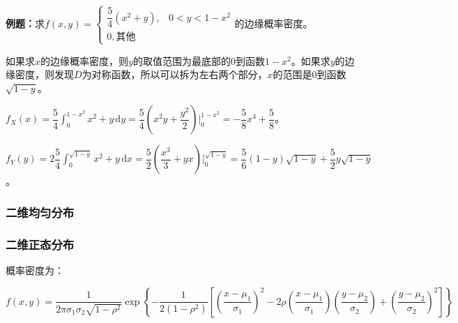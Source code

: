 \documentclass[UTF8, 12pt]{ctexart}
\begin{document}
\textbf{例题：}求$f(x,y)=\left\{\begin{array}{ll}
    \dfrac{5}{4}(x^2+y), & 0<y<1-x^2 \\
    0, \text{其他}
\end{array}\right.$的边缘概率密度。

\begin{minipage}{0.5\linewidth}
    
    如果求$x$的边缘概率密度，则$y$的取值范围为最底部的0到函数$1-x^2$。如果求$y$的边缘密度，则发现$D$为对称函数，所以可以拆为左右两个部分，$x$的范围是$0$到函数$\sqrt{1-y}$。

\end{minipage}
\hfill
\begin{minipage}{0.4\linewidth}
\end{minipage}

$f_X(x)=\dfrac{5}{4}\int_0^{1-x^2}x^2+y\,\textrm{d}y=\dfrac{5}{4}\left(x^2y+\dfrac{y^2}{2}\right)\bigg\vert_0^{1-x^2}=-\dfrac{5}{8}x^4+\dfrac{5}{8}$。

$f_Y(y)=2\dfrac{5}{4}\int_0^{\sqrt{1-y}}x^2+y\,\textrm{d}x=\dfrac{5}{2}\left(\dfrac{x^3}{3}+yx\right)\bigg\vert_0^{\sqrt{1-y}}=\dfrac{5}{6}(1-y)\sqrt{1-y}+\dfrac{5}{2}y\sqrt{1-y}$。

\subsubsection{二维均匀分布}

\subsubsection{二维正态分布}

概率密度为：

{\fontsize{8.2pt}{10pt}$f(x,y)=\dfrac{1}{2\pi\sigma_1\sigma_2\sqrt{1-\rho^2}}\exp\left\{-\dfrac{1}{2(1-\rho^2)}\left[\left(\dfrac{x-\mu_1}{\sigma_1}\right)^2-2\rho\left(\dfrac{x-\mu_1}{\sigma_1}\right)\left(\dfrac{y-\mu_2}{\sigma_2}\right)+\left(\dfrac{y-\mu_2}{\sigma_2}\right)^2\right]\right\}$}
\end{document}
